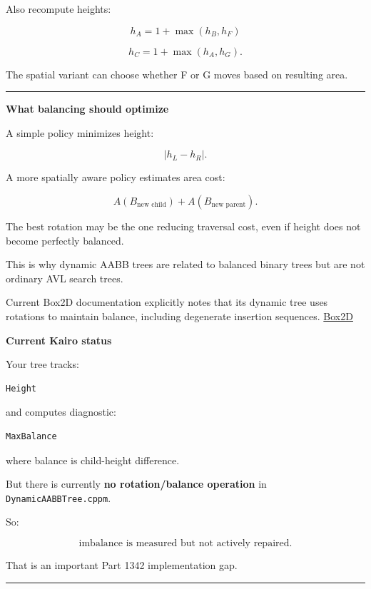 Also recompute heights:

\[
h_A=1+\max(h_B,h_F)
\]

\[
h_C=1+\max(h_A,h_G).
\]

The spatial variant can choose whether F or G moves based on resulting area.

\begin{center}\rule{0.5\linewidth}{0.5pt}\end{center}

\textbf{What balancing should optimize}

A simple policy minimizes height:

\[
|h_L-h_R|.
\]

A more spatially aware policy estimates area cost:

\[
A(B_{\text{new child}})
+
A(B_{\text{new parent}}).
\]

The best rotation may be the one reducing traversal cost, even if height does not become perfectly balanced.

This is why dynamic AABB trees are related to balanced binary trees but are not ordinary AVL search trees.

Current Box2D documentation explicitly notes that its dynamic tree uses rotations to maintain balance, including degenerate insertion sequences. \href{https://box2d.org/doc_version_2_4/md__e_1_2github_2box2d__24_2docs_2collision.html?utm_source=chatgpt.com}{Box2D}

\textbf{Current Kairo status}

Your tree tracks:

\begin{verbatim}
Height
\end{verbatim}

and computes diagnostic:

\begin{verbatim}
MaxBalance
\end{verbatim}

where balance is child-height difference.

But there is currently \textbf{no rotation/balance operation} in \texttt{DynamicAABBTree.cppm}.

So:

\[
\boxed{
\text{imbalance is measured but not actively repaired}.
}
\]

That is an important Part 1342 implementation gap.

\begin{center}\rule{0.5\linewidth}{0.5pt}\end{center}

